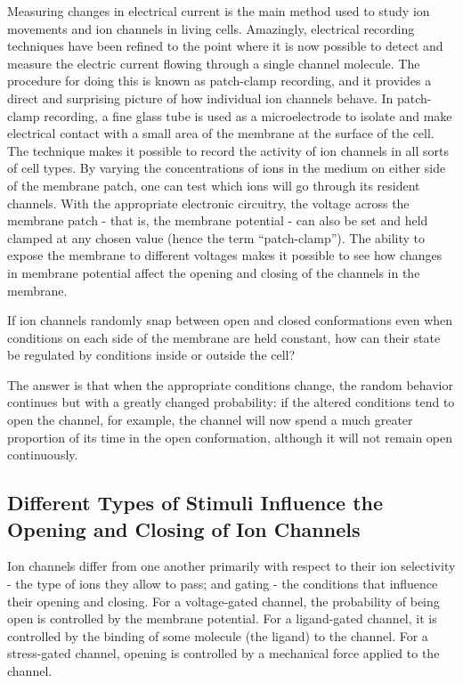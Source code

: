 Measuring changes in electrical current is the main method used to study
ion movements and ion channels in living cells. Amazingly, electrical
recording techniques have been refined to the point where it is now possible
to detect and measure the electric current flowing through a single
channel molecule. The procedure for doing this is known as patch-clamp
recording, and it provides a direct and surprising picture of how individual
ion channels behave.
In patch-clamp recording, a fine glass tube is used as a microelectrode to
isolate and make electrical contact with a small area of the membrane
at the surface of the cell. The technique makes it possible
to record the activity of ion channels in all sorts of cell types.
By varying the concentrations of ions in
the medium on either side of the membrane patch, one can test which
ions will go through its resident channels. With the appropriate electronic
circuitry, the voltage across the membrane patch - that is, the membrane
potential - can also be set and held clamped at any chosen value (hence
the term “patch-clamp”). The ability to expose the membrane to different
voltages makes it possible to see how changes in membrane potential
affect the opening and closing of the channels in the membrane.

If ion channels randomly snap between open and closed conformations
even when conditions on each side of the membrane are held constant,
how can their state be regulated by conditions inside or outside the cell?

The answer is that when the appropriate conditions change, the random
behavior continues but with a greatly changed probability: if the altered
conditions tend to open the channel, for example, the channel will now
spend a much greater proportion of its time in the open conformation,
although it will not remain open continuously.

\subsection{Different Types of Stimuli Influence the Opening and Closing of Ion Channels}

Ion channels differ from one another primarily with respect to their ion selectivity - the type of ions they allow to pass; and
gating - the conditions that influence their opening and closing. For a
voltage-gated channel, the probability of being open is controlled by
the membrane potential. For a ligand-gated channel, it
is controlled by the binding of some molecule (the ligand) to the channel.
For a stress-gated channel, opening is controlled
by a mechanical force applied to the channel.

